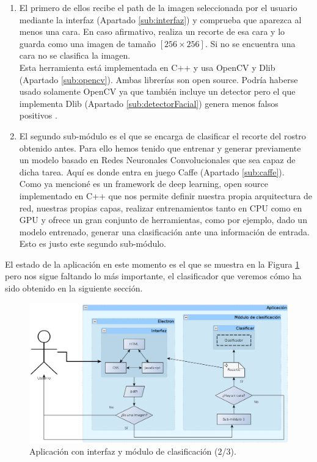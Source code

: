 \documentclass[a4paper,11pt]{book}
\begin{document}
\begin{enumerate}
	\item El primero de ellos recibe el path de la imagen seleccionada por el usuario mediante la interfaz (Apartado \ref{sub:interfaz}) y comprueba que aparezca al menos una cara. En caso afirmativo, realiza un recorte de esa cara y lo guarda como una imagen de tamaño \([256\times256]\). Si no se encuentra una cara no se clasifica la imagen.\\
	Esta herramienta está implementada en C++ y usa OpenCV y Dlib  (Apartado \ref{sub:opencv}). Ambas librerías son open source. Podría haberse usado solamente OpenCV ya que también incluye un detector pero el que implementa Dlib (Apartado \ref{sub:detectorFacial}) genera menos falsos positivos \cite{king14}.
	\item El segundo sub-módulo es el que se encarga de clasificar el recorte del rostro obtenido antes. Para ello hemos tenido que entrenar y generar previamente un modelo basado en Redes Neuronales Convolucionales que sea capaz de dicha tarea. Aquí es donde entra en juego Caffe (Apartado \ref{sub:caffe}).\\
	Como ya mencioné es un framework de deep learning, open source implementado en C++ que nos permite definir nuestra propia arquitectura de red, nuestras propias capas, realizar entrenamientos tanto en CPU como en GPU y ofrece un gran conjunto de herramientas, como por ejemplo, dado un modelo entrenado, generar una clasificación ante una información de entrada. Esto es justo este segundo sub-módulo.
\end{enumerate}

El estado de la aplicación en este momento es el que se muestra en la Figura \ref{fig:moduloClasificacion} pero nos sigue faltando lo más importante, el clasificador que veremos cómo ha sido obtenido en la siguiente sección.
\begin{figure}[h]
\centering
\includegraphics[width=0.9\linewidth]{imagenes/moduloClasificacion}
\caption[Módulo de Clasificación]{Aplicación con interfaz y módulo de clasificación (2/3).}
\label{fig:moduloClasificacion}
\end{figure}
\end{document}
